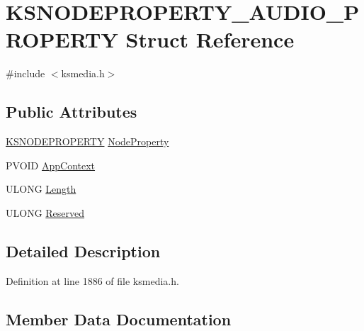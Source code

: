 \hypertarget{struct_k_s_n_o_d_e_p_r_o_p_e_r_t_y___a_u_d_i_o___p_r_o_p_e_r_t_y}{}\section{K\+S\+N\+O\+D\+E\+P\+R\+O\+P\+E\+R\+T\+Y\+\_\+\+A\+U\+D\+I\+O\+\_\+\+P\+R\+O\+P\+E\+R\+TY Struct Reference}
\label{struct_k_s_n_o_d_e_p_r_o_p_e_r_t_y___a_u_d_i_o___p_r_o_p_e_r_t_y}


{\ttfamily \#include $<$ksmedia.\+h$>$}

\subsection*{Public Attributes}
\begin{DoxyCompactItemize}
\item 
\hyperlink{struct_k_s_n_o_d_e_p_r_o_p_e_r_t_y}{K\+S\+N\+O\+D\+E\+P\+R\+O\+P\+E\+R\+TY} \hyperlink{struct_k_s_n_o_d_e_p_r_o_p_e_r_t_y___a_u_d_i_o___p_r_o_p_e_r_t_y_a5823e85de42ae1791cbcef531756f8af}{Node\+Property}
\item 
P\+V\+O\+ID \hyperlink{struct_k_s_n_o_d_e_p_r_o_p_e_r_t_y___a_u_d_i_o___p_r_o_p_e_r_t_y_a9b425dacd9c8f472d11eaaa00f287d44}{App\+Context}
\item 
U\+L\+O\+NG \hyperlink{struct_k_s_n_o_d_e_p_r_o_p_e_r_t_y___a_u_d_i_o___p_r_o_p_e_r_t_y_a9e99fcff1db6419217a7580918f3d388}{Length}
\item 
U\+L\+O\+NG \hyperlink{struct_k_s_n_o_d_e_p_r_o_p_e_r_t_y___a_u_d_i_o___p_r_o_p_e_r_t_y_a0e2897be481c76900e2af254fbd3a909}{Reserved}
\end{DoxyCompactItemize}


\subsection{Detailed Description}


Definition at line 1886 of file ksmedia.\+h.



\subsection{Member Data Documentation}
